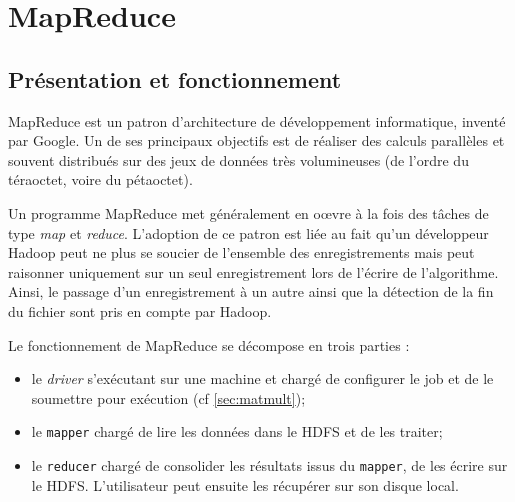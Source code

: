 \section{MapReduce}
\subsection{Présentation et fonctionnement}

\par MapReduce est un patron d'architecture de développement informatique, inventé par Google. Un de ses principaux objectifs est de réaliser des calculs parallèles et souvent distribués sur des jeux de données très volumineuses (de l'ordre du téraoctet, voire du pétaoctet).

\par Un programme MapReduce met généralement en o\oe{}vre à la fois des tâches de type \textit{map} et \textit{reduce}. L'adoption de ce patron est liée au fait qu'un développeur Hadoop peut ne plus se soucier de l'ensemble des enregistrements mais peut raisonner uniquement sur un seul enregistrement lors de l'écrire de l'algorithme. Ainsi, le passage d'un enregistrement à un autre ainsi que la détection de la fin du fichier sont pris en compte par Hadoop.

\par Le fonctionnement de MapReduce se décompose en trois parties :
\begin{itemize}
\item le \textit{driver} s'exécutant sur une machine et chargé de configurer le job et de le soumettre pour exécution (cf \ref{sec:matmult});
\item le \texttt{mapper} chargé de lire les données dans le HDFS et de les traiter;
\item le \texttt{reducer} chargé de consolider les résultats issus du \texttt{mapper}, de les écrire sur le HDFS. L'utilisateur peut ensuite les récupérer sur son disque local.
\end{itemize}


